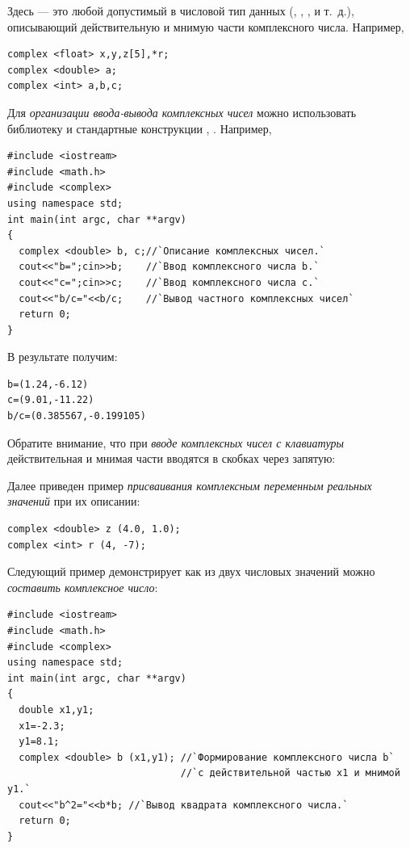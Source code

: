 Здесь  --- это любой допустимый в  числовой тип данных (,
, ,  и т.~д.), описывающий действительную и
мнимую части комплексного числа. Например,
\begin{lstlisting}
complex <float> x,y,z[5],*r;
complex <double> a;
complex <int> a,b,c;
\end{lstlisting}
Для \emph{организации ввода-вывода
комплексных чисел} можно использовать библиотеку  и стандартные
конструкции , . Например,
\begin{lstlisting}
#include <iostream>
#include <math.h>
#include <complex>
using namespace std;
int main(int argc, char **argv)
{
  complex <double> b, c;//`Описание комплексных чисел.`
  cout<<"b=";cin>>b;    //`Ввод комплексного числа b.`
  cout<<"c=";cin>>c;    //`Ввод комплексного числа c.`
  cout<<"b/c="<<b/c;    //`Вывод частного комплексных чисел`
  return 0;
}
\end{lstlisting}

В результате получим:
\begin{verbatim}
b=(1.24,-6.12)
c=(9.01,-11.22)
b/c=(0.385567,-0.199105)
\end{verbatim}
Обратите внимание, что при \emph{вводе комплексных чисел с клавиатуры} действительная и мнимая части
вводятся в скобках через запятую:


Далее приведен пример \emph{присваивания комплексным переменным реальных значений} при их описании:
\begin{lstlisting}
complex <double> z (4.0, 1.0);
complex <int> r (4, -7);
\end{lstlisting}

Следующий пример демонстрирует как из двух числовых значений можно \emph{составить комплексное число}:
\begin{lstlisting}
#include <iostream>
#include <math.h>
#include <complex>
using namespace std;
int main(int argc, char **argv)
{
  double x1,y1;
  x1=-2.3;
  y1=8.1;
  complex <double> b (x1,y1); //`Формирование комплексного числа b` 
                              //`с действительной частью x1 и мнимой y1.`
  cout<<"b^2="<<b*b; //`Вывод квадрата комплексного числа.`
  return 0;
}
\end{lstlisting}

